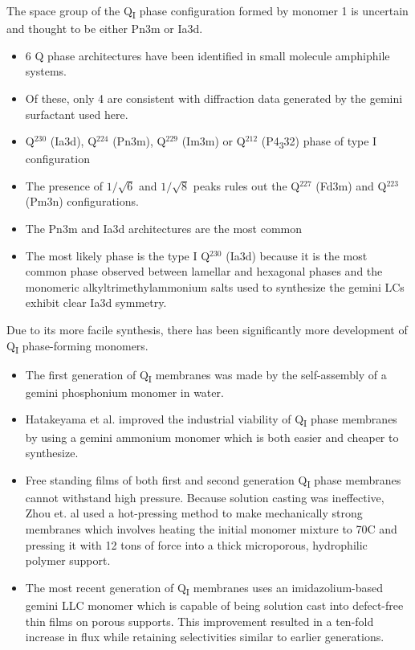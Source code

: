  The space group of the Q\textsubscript{I} phase configuration formed by
  monomer 1 is uncertain and thought to be either Pn3m or Ia3d.
  \begin{itemize}
    \item 6 Q phase architectures have been identified in small molecule
    amphiphile systems.~\cite{mariani_cubic_1988}
    \item Of these, only 4 are consistent with diffraction data generated
    by the gemini surfactant used here.~\cite{pindzola_cross-linked_2003}
    \item Q$^{230}$ (Ia3d), Q$^{224}$ (Pn3m), Q$^{229}$ (Im3m) or Q$^{212}$ (P4\textsubscript{3}32) phase of type I configuration
    \item The presence of $1 / \sqrt{6}$ and $1 / \sqrt{8}$ peaks rules out the
    Q$^{227}$ (Fd3m) and Q$^{223}$ (Pm3n) configurations.
    \item The Pn3m and Ia3d architectures are the most common~\cite{mariani_cubic_1988,wiesenauer_nanoporous_2012}
    \item The most likely phase is the type I Q$^{230}$ (Ia3d) because it is the
    most common phase observed between lamellar and hexagonal phases and the
    monomeric alkyltrimethylammonium salts used to synthesize the gemini LCs
    exhibit clear Ia3d symmetry.
  \end{itemize}
  
  Due to its more facile synthesis, there has been significantly more development
  of Q\textsubscript{I} phase-forming monomers.
  \begin{itemize}
    \item The first generation of Q\textsubscript{I} membranes was made by 
    the self-assembly of a gemini phosphonium monomer in water.~\cite{pindzola_cross-linked_2003}
    \item Hatakeyama et al. improved the industrial viability of Q\textsubscript{I} 
    phase membranes by using a gemini ammonium monomer which is both easier and cheaper
    to synthesize.~\cite{hatakeyama_nanoporous_2010}
    \item Free standing films of both first and second generation Q\textsubscript{I} phase 
    membranes cannot withstand high pressure. Because solution casting was ineffective, Zhou
    et. al used a hot-pressing method to make mechanically strong membranes which involves 
    heating the initial monomer mixture to 70\degree C and pressing it with 12 tons of force
    into a thick microporous, hydrophilic polymer support.~\cite{zhou_new_2007}
    \item The most recent generation of Q\textsubscript{I} membranes uses an imidazolium-based
    gemini LLC monomer which is capable of being solution cast into defect-free thin films on
    porous supports. This improvement resulted in a ten-fold increase in flux while retaining
    selectivities similar to earlier generations.~\cite{carter_glycerol-based_2012}
  \end{itemize}
  
